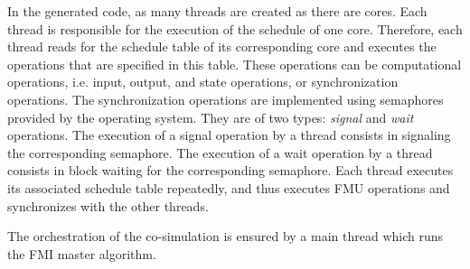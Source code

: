 In the generated code, as many threads are created as there are cores. Each thread is responsible for the execution of the schedule of one core. Therefore, each thread reads for the schedule table of its corresponding core and executes the operations that are specified in this table. These operations can be computational operations, i.e. input, output, and state operations, or synchronization operations. The synchronization operations are implemented using semaphores provided by the operating system. They are of two types: \textit{signal} and \textit{wait} operations. The execution of a signal operation by a thread consists in signaling the corresponding semaphore. The execution of a wait operation by a thread consists in block waiting for the corresponding semaphore. Each thread executes its associated schedule table repeatedly, and thus executes FMU operations and synchronizes with the other threads. 

The orchestration of the co-simulation is ensured by a main thread which runs the FMI master algorithm.


